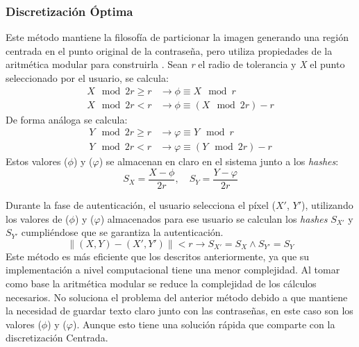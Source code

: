 \subsubsection{Discretización Óptima}
	
Este método mantiene la filosofía de particionar la imagen generando una región centrada en el punto original de la contraseña, pero utiliza propiedades de la aritmética modular para construirla \cite{bicakci2008optimal}. Sean \textit{r} el radio de tolerancia y \textit{X} el punto seleccionado por el usuario, se calcula:
\begin{equation}
	\begin{aligned}
		\textit{X} \mod{2r} \geq r &\rightarrow \phi \equiv X \mod{r} \\
		\textit{X} \mod{2r} < r &\rightarrow \phi \equiv (X \mod{2r}) - r
	\end{aligned}
	\label{eq:phi}
\end{equation}
De forma análoga se calcula:
\begin{equation}
	\begin{aligned}
		\textit{Y} \mod{2r} \geq r &\rightarrow \varphi \equiv Y \mod{r} \\
		\textit{Y} \mod{2r} < r &\rightarrow \varphi \equiv (Y \mod{2r}) - r
	\end{aligned}
	\label{eq:varphi}
\end{equation}
Estos valores (\(\phi\)) y (\(\varphi\)) se almacenan en claro en el sistema junto a los \textit{hashes}:
\begin{equation}
	S_X = \frac{X - \phi}{2r}, \quad S_Y = \frac{Y - \varphi}{2r} \label{eq:hashes}
\end{equation}

Durante la fase de autenticación, el usuario selecciona el píxel ($X'$, $Y'$), utilizando los valores de (\(\phi\)) y (\(\varphi\)) almacenados para ese usuario se calculan los \textit{hashes} \(S_{X'}\) y \(S_{Y'}\) cumpliéndose que se garantiza la autenticación.
\begin{equation}
	\|(X, Y) - (X', Y')\| < r \rightarrow S_{X'} = S_X \land S_{Y'} = S_Y \label{eq:autenticacion}
\end{equation}
Este método es más eficiente que los descritos anteriormente, ya que su implementación a nivel computacional tiene una menor complejidad. Al tomar como base la aritmética modular se reduce la complejidad de los cálculos necesarios. No soluciona el problema del anterior método debido a que mantiene la necesidad de guardar texto claro junto con  las  contraseñas,  en  este  caso  son  los  valores   ($\phi$)  y  ($\varphi$).  Aunque  esto tiene  una  solución  rápida  que comparte con la discretización Centrada.

